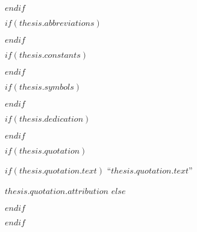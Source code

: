 $endif$

$if(thesis.abbreviations)$



$endif$

$if(thesis.constants)$



$endif$

$if(thesis.symbols)$



$endif$

$if(thesis.dedication)$

\dedicatory{} 

$endif$

$if(thesis.quotation)$
\vspace*{0.2\textheight}

$if(thesis.quotation.text)$
\noindent``{\itshape $thesis.quotation.text$}''\bigbreak

\hfill $thesis.quotation.attribution$
$else$

$endif$

$endif$



\pagestyle{plain} %
